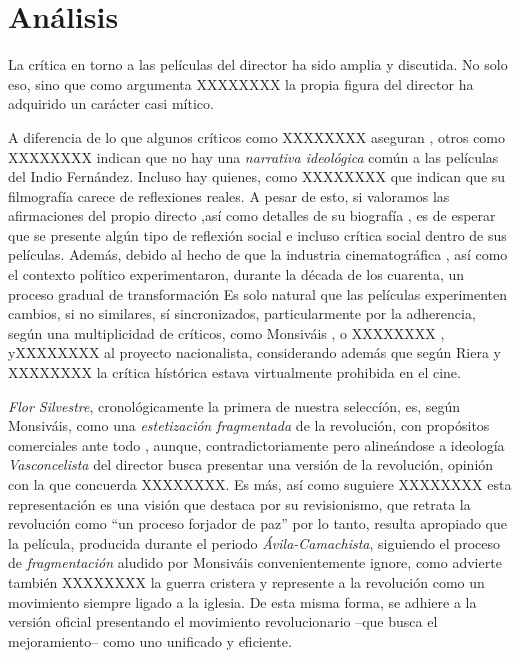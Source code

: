 \section{Análisis}
La crítica en torno a las películas del director ha sido amplia y discutida. No solo eso, sino que como argumenta XXXXXXXX la propia figura del director ha adquirido un carácter casi mítico. %

A diferencia de lo que algunos críticos como XXXXXXXX aseguran %
, otros como XXXXXXXX indican que no hay una \emph{narrativa ideológica} común a las películas del Indio Fernández.%
Incluso hay quienes, como XXXXXXXX que indican que su filmografía carece de reflexiones reales.%
A pesar de esto, si valoramos las afirmaciones del propio directo
 ,así como detalles de su biografía%
 , es de esperar que se presente algún tipo de reflexión social e incluso crítica social dentro de sus películas. 
Además, debido al hecho de que la industria cinematográfica%
, así como el contexto político %
 experimentaron, durante la década de los cuarenta, un proceso gradual de transformación%
Es solo natural que las películas experimenten cambios, si no similares, sí sincronizados, particularmente por la adherencia, según una multiplicidad de críticos, como Monsiváis%
, o XXXXXXXX %
, yXXXXXXXX 
al proyecto nacionalista, considerando además que según Riera%
y  XXXXXXXX %
la crítica hístórica estava virtualmente prohibida en el cine.  

\emph{Flor Silvestre}, cronológicamente%
la primera de nuestra seleccíón, es, según Monsiváis, 
como una \emph{estetización fragmentada}%
 de la revolución, con propósitos comerciales ante todo%
, aunque, contradictoriamente pero alineándose a ideología \emph{Vasconcelista} del director %
busca presentar una versión de la revolución, opinión con la que concuerda XXXXXXXX.%
Es más, así como suguiere XXXXXXXX esta representación es una visión que destaca por su revisionismo,%
 que retrata la revolución como ``un proceso forjador de paz''%
por lo tanto, resulta apropiado que la película, producida durante el periodo \emph{Ávila-Camachista}, siguiendo el proceso de \emph{fragmentación} aludido por Monsiváis%
convenientemente ignore, como advierte también XXXXXXXX la guerra cristera y represente a la revolución como un movimiento siempre ligado a la iglesia.%
De esta misma forma, se adhiere a la versión oficial%
 presentando  el movimiento revolucionario --que busca el mejoramiento-- como uno unificado y eficiente.%

